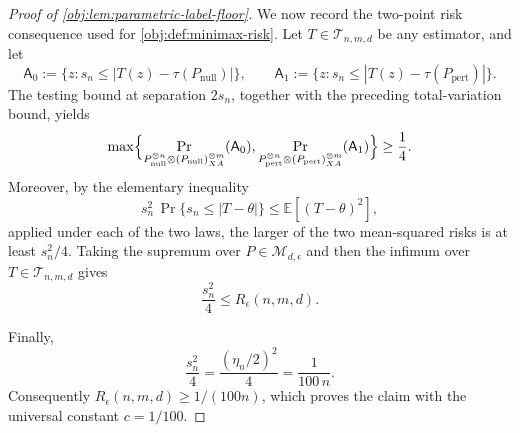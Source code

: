 \begin{proof}[Proof of \cref{obj:lem:parametric-label-floor}]
We now record the two-point risk consequence used for \cref{obj:def:minimax-risk}. Let \(T\in\mathcal T_{n,m,d}\) be any estimator, and let
\[
\mathsf A_0:=\{z:s_n\le |T(z)-\tau(P_{\mathrm{null}})|\},
\qquad
\mathsf A_1:=\{z:s_n\le |T(z)-\tau(P_{\mathrm{pert}})|\}.
\]
The testing bound at separation \(2s_n\), together with the preceding total-variation bound, yields
\[
\max\Bigl\{
\Pr_{P_{\mathrm{null}}^{\otimes n}\otimes(P_{\mathrm{null}})_{XA}^{\otimes m}}(\mathsf A_0),
\Pr_{P_{\mathrm{pert}}^{\otimes n}\otimes(P_{\mathrm{pert}})_{XA}^{\otimes m}}(\mathsf A_1)
\Bigr\}
\ge \frac14 .
\]
Moreover, by the elementary inequality
\[
s_n^2\,\Pr\{s_n\le |T-\theta|\}
\le
\mathbb E[(T-\theta)^2],
\]
applied under each of the two laws, the larger of the two mean-squared risks is at least \(s_n^2/4\). Taking the supremum over \(P\in\mathcal M_{d,\epsilon}\) and then the infimum over \(T\in\mathcal T_{n,m,d}\) gives
\[
\frac{s_n^2}{4}\le R_\epsilon(n,m,d).
\]

Finally,
\[
\frac{s_n^2}{4}
=
\frac{(\eta_n/2)^2}{4}
=
\frac{1}{100\,n}.
\]
Consequently \(R_\epsilon(n,m,d)\ge 1/(100n)\), which proves the claim with the universal constant \(c=1/100\). %
\end{proof}

